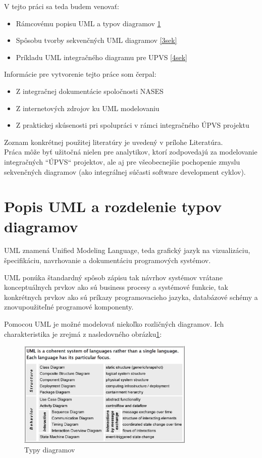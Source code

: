 \documentclass[10pt,twoside,slovak,a4paper]{article}
\begin{document}
V tejto práci sa teda budem venovať:

\begin{itemize}
\item Rámcovému popisu UML a typov diagramov \ref{2sek}
\item Spôsobu tvorby sekvenčných UML diagramov \ref{3sek}
\item Príkladu UML integračného diagramu pre UPVS \ref{4sek}
\end{itemize}

Informácie pre vytvorenie tejto práce som čerpal:

\begin{itemize}
\item Z integračnej dokumentácie spoločnosti NASES
\item Z internetových zdrojov ku UML modelovaniu
\item Z praktickej skúsenosti pri spolupráci v rámci integračného ÚPVS projektu
\end{itemize}
Zoznam konkrétnej použitej literatúry je uvedený v prílohe Literatúra.\\

Práca môže byť užitočná nielen pre analytikov, ktorí zodpovedajú za modelovanie integračných ``ÚPVS“ projektov, ale aj pre všeobecnejšie pochopenie zmyslu sekvenčných diagramov (ako integrálnej súčasti software development cyklov).




\section{Popis UML a rozdelenie typov diagramov} \label{2sek}

UML znamená Unified Modeling Language, teda grafický jazyk na vizualizáciu, špecifikáciu, navrhovanie a dokumentáciu programových systémov. 

UML ponúka štandardný spôsob zápisu tak návrhov systémov vrátane konceptuálnych prvkov ako sú business procesy a systémové funkcie, tak konkrétnych prvkov ako sú príkazy programovacieho jazyka, databázové schémy a znovupoužiteľné programové komponenty.\cite{WIKI}\newpage

Pomocou UML je možné modelovať niekoľko rozličných diagramov. Ich charakteristika je zrejmá z nasledovného obrázku\ref{TypyD}:


\begin{figure}[h]
\centering
\includegraphics[width=0.75\textwidth]{Images/Obr1.jpg}
\caption{Typy diagramov\cite{UMLUni}}
\label{TypyD}
\end{figure}
\end{document}
